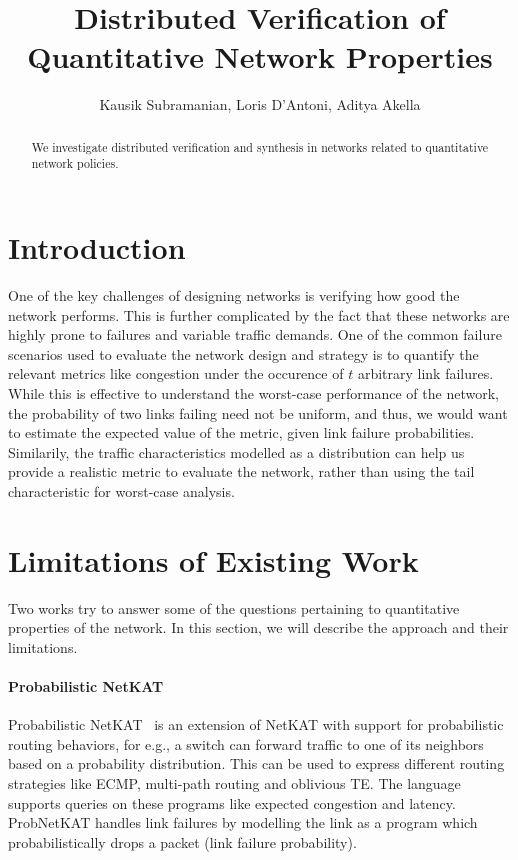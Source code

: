 \documentclass[]{article}
\title{Distributed Verification of Quantitative Network Properties}
\author{Kausik Subramanian, Loris D'Antoni, Aditya Akella}
\begin{document}
\maketitle

\begin{abstract}
We investigate distributed verification and synthesis in 
networks related to quantitative network policies.
\end{abstract}

\section{Introduction}
One of the key challenges of designing networks is verifying
how good the network performs. This is further complicated 
by the fact that these networks are highly prone to failures
and variable traffic demands. One of the common failure scenarios
used to evaluate the network design and strategy is to quantify 
the relevant metrics like congestion under the occurence  
of $t$ arbitrary link failures. While this is effective to understand
the worst-case performance of the network, the probability
of two links failing need not be uniform, and thus, we would 
want to estimate the expected value of the metric, given
link failure probabilities. Similarily, the traffic characteristics
modelled as a distribution can help us provide a realistic
metric to evaluate the network, rather than using the tail
characteristic for worst-case analysis.

\section{Limitations of Existing Work}
Two works try to answer some of the questions pertaining to
quantitative properties of the network. In this section, we 
will describe the approach and their limitations.

\paragraph{Probabilistic NetKAT}
Probabilistic NetKAT~\cite{probnetkat, probnetkatpopl17} 
is an extension of NetKAT with support
for probabilistic routing behaviors, for e.g., a switch 
can forward traffic to one of its neighbors based on a 
probability distribution. This can be used to express different
routing strategies like ECMP, multi-path routing and 
oblivious TE. The language supports queries 
on these programs like expected congestion and latency. ProbNetKAT
handles link failures by modelling the link as a program
which probabilistically drops a packet (link failure
probability).
\end{document}
